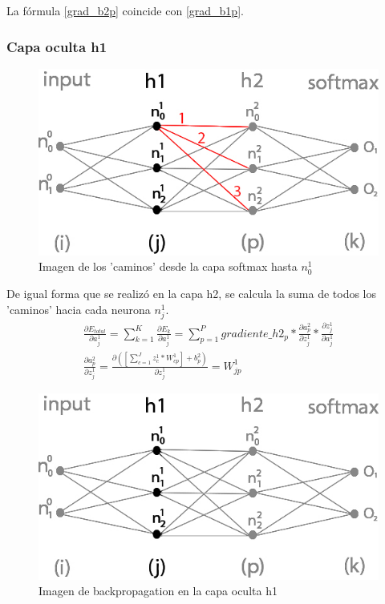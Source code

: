 La fórmula \ref{grad_b2p} coincide con \ref{grad_b1p}. \\

\subsubsection{Capa oculta h1}

\begin{figure}[H]
	\centering
	\includegraphics[scale=0.35]{imagenes/nn_h1_caminos_posibles.jpg}  
	\caption{Imagen de los 'caminos' desde la capa softmax hasta $n^1_0$}
	\label{nn_h1_caminos_posibles}
\end{figure}

De igual forma que se realizó en la capa h2, se calcula la suma de todos los 'caminos' hacia cada neurona $n^1_j$. \\

\begin{gather}
	\frac{\partial E_{total}}{\partial a^1_j} = \sum_{k=1}^K \frac{\partial E_k}{\partial a^1_j} = \sum_{p=1}^P  gradiente\_h2_p * \frac{\partial a^2_p}{\partial z^1_j} * \frac{\partial z^1_j}{\partial a^1_j} \\
	\frac{\partial a^2_p}{\partial z^1_j} = \frac{\partial( [\sum_{c=1}^{J} z^1_c * W^1_{cp}] + b^2_p)}{\partial z^1_j} = W^1_{jp}
\end{gather}

\begin{figure}[H]
	\centering
	\includegraphics[scale=0.35]{imagenes/nn_2_capa_h1.jpg}  
	\caption{Imagen de backpropagation en la capa oculta h1}
\end{figure}

